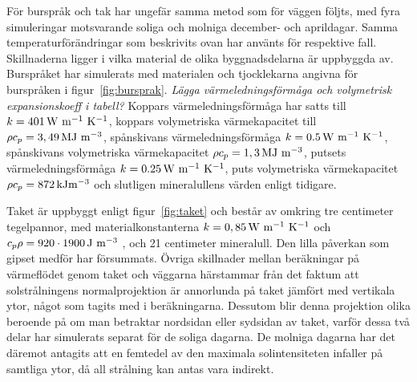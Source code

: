 För burspråk och tak har ungefär samma metod som för väggen följts, med fyra simuleringar motsvarande soliga och
molniga december- och aprildagar. Samma temperaturförändringar som beskrivits ovan har använts för
respektive fall. Skillnaderna ligger i vilka material de olika byggnadsdelarna är uppbyggda av.
Burspråket har simulerats med materialen och tjocklekarna angivna för burspråken i figur~\ref{fig:bursprak}. \emph{\color{red} Lägga värmeledningsförmåga och volymetrisk expansionskoeff i tabell?}
Koppars värmeledningsförmåga har satts till $k=\unit[401]{W~m^{-1}~K^{-1}}$, koppars volymetriska värmekapacitet till $\rho c_p = \unit[3,49]{MJ~m^{-3}}$, spånskivans värmeledningsförmåga $k = \unit[0.5]{W~m^{-1}~K^{-1}}$, spånskivans volymetriska
värmekapacitet $\rho c_p = \unit[1,3]{MJ~m^{-3}}$, putsets värmeledningsförmåga $k = \unit[0.25]{W~m^{-1}~K^{-1}}$, puts volymetriska
värmekapacitet $\rho c_p = \unit[872]{kJm^{-3}}$ och slutligen mineralullens värden
enligt tidigare.
\cite{engineeringcom}\cite{kandidatarbete2010}\cite{engineeringtoolboxthermalconductivity}\cite{engineeringtoolboxspecificheat}

Taket är uppbyggt enligt figur~\ref{fig:taket} och består av omkring tre centimeter tegelpannor, med materialkonstanterna $k = \unit[0,85]{W~m^{-1}~K^{-1}}$ och $c_p\rho = \unit[920\cdot 1900]{J~m^{-3}}$ \cite{ozel11}, och 21 centimeter mineralull. Den lilla påverkan som gipset medför har försummats. Övriga skillnader mellan beräkningar på värmeflödet genom taket och väggarna härstammar från det faktum att solstrålningens normalprojektion är annorlunda på taket jämfört med vertikala ytor, något som tagits med i beräkningarna. Dessutom blir denna projektion olika beroende på om man betraktar nordsidan eller sydsidan av taket, varför dessa två delar har simulerats separat för de soliga dagarna. De molniga dagarna har det däremot antagits att en femtedel av den maximala solintensiteten infaller på samtliga ytor, då all strålning kan antas vara indirekt.


